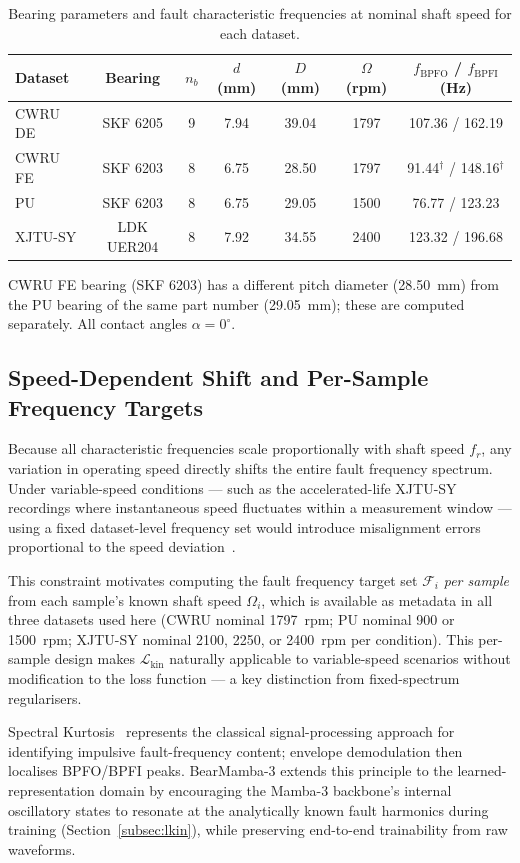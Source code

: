 \begin{table}[htbp]
\centering
\caption{Bearing parameters and fault characteristic frequencies at
         nominal shaft speed for each dataset.}
\label{tab:bearing_params}
\begin{tabular}{lcccccc}
\toprule
Dataset & Bearing & $n_b$ & $d$ (mm) & $D$ (mm) & $\Omega$ (rpm)
        & $f_{\text{BPFO}}$ / $f_{\text{BPFI}}$ (Hz) \\
\midrule
CWRU DE & SKF 6205 & 9 & 7.94  & 39.04 & 1797
         & 107.36 / 162.19 \\
CWRU FE & SKF 6203 & 8 & 6.75  & 28.50 & 1797
         & 91.44$^\dagger$ / 148.16$^\dagger$ \\
PU      & SKF 6203 & 8 & 6.75  & 29.05 & 1500
         & 76.77 / 123.23 \\
XJTU-SY & LDK UER204 & 8 & 7.92 & 34.55 & 2400
          & 123.32 / 196.68 \\
\bottomrule
\end{tabular}
\begin{tablenotes}
\item[$\dagger$] CWRU FE bearing (SKF 6203) has a different pitch diameter
  (28.50~mm) from the PU bearing of the same part number (29.05~mm);
  these are computed separately.
  All contact angles $\alpha = 0^\circ$.
\end{tablenotes}
\end{table}

\subsection{Speed-Dependent Shift and Per-Sample Frequency Targets}
\label{subsec:phys_speed}

Because all characteristic frequencies scale proportionally with shaft
speed $f_r$, any variation in operating speed directly shifts the
entire fault frequency spectrum.
Under variable-speed conditions — such as the accelerated-life XJTU-SY
recordings where instantaneous speed fluctuates within a measurement window
— using a fixed dataset-level frequency set would introduce misalignment
errors proportional to the speed deviation~\cite{liu2023var_speed,liao2020variable_domain}.

This constraint motivates computing the fault frequency target set
$\mathcal{F}_i$ \emph{per sample} from each sample's known shaft speed
$\Omega_i$, which is available as metadata in all three datasets used here
(CWRU nominal 1797~rpm; PU nominal 900 or 1500~rpm; XJTU-SY nominal 2100,
2250, or 2400~rpm per condition).
This per-sample design makes $\mathcal{L}_{\text{kin}}$ naturally applicable
to variable-speed scenarios without modification to the loss function —
a key distinction from fixed-spectrum regularisers.

Spectral Kurtosis~\cite{antoni2006spectral_kurtosis} represents the
classical signal-processing approach for identifying impulsive
fault-frequency content; envelope demodulation then localises BPFO/BPFI
peaks.
BearMamba-3 extends this principle to the learned-representation domain
by encouraging the Mamba-3 backbone's internal oscillatory states to
resonate at the analytically known fault harmonics during training
(Section~\ref{subsec:lkin}), while preserving end-to-end trainability
from raw waveforms.
